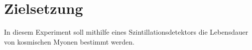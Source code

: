 \section{Zielsetzung}
\label{sec:Zielsetzung}

In diesem Experiment soll mithilfe eines Szintillationsdetektors die
Lebensdauer von kosmischen Myonen bestimmt werden.